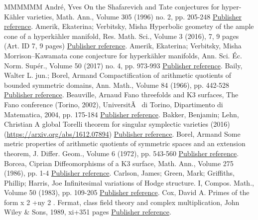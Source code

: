 \begin{thebibliography}{MMMMMM}
 André, Yves On the Shafarevich and Tate conjectures for hyper-Kähler varieties, Math. Ann., Volume 305 (1996) no. 2, pp. 205-248 \href{https://ahl.centre-mersenne.org/item/AHL_2018__1__227_0/#Andre}{Publisher reference}.
 Amerik, Ekaterina; Verbitsky, Misha Hyperbolic geometry of the ample cone of a hyperkähler manifold, Res. Math. Sci., Volume 3 (2016), 7, 9 pages (Art. ID 7, 9 pages) \href{https://ahl.centre-mersenne.org/item/AHL_2018__1__227_0/#AmVerb2}{Publisher reference}.
 Amerik, Ekaterina; Verbitsky, Misha Morrison–Kawamata cone conjecture for hyperkähler manifolds, Ann. Sci. Éc. Norm. Supér., Volume 50 (2017) no. 4, pp. 973-993 \href{https://ahl.centre-mersenne.org/item/AHL_2018__1__227_0/#AmVerb}{Publisher reference}.
 Baily, Walter L. jun.; Borel, Armand Compactification of arithmetic quotients of bounded symmetric domains, Ann. Math., Volume 84 (1966), pp. 442-528 \href{https://ahl.centre-mersenne.org/item/AHL_2018__1__227_0/#BB}{Publisher reference}.
 Beauville, Arnaud Fano threefolds and K3 surfaces, The Fano conference (Torino, 2002), UniversitÃ  di Torino, Dipartimento di Matematica, 2004, pp. 175-184 \href{https://ahl.centre-mersenne.org/item/AHL_2018__1__227_0/#Beauv}{Publisher reference}.
 Bakker, Benjamin; Lehn, Christian A global Torelli theorem for singular symplectic varieties (2016) (\url{https://arxiv.org/abs/1612.07894}) \href{https://ahl.centre-mersenne.org/item/AHL_2018__1__227_0/#BL}{Publisher reference}.
 Borel, Armand Some metric properties of arithmetic quotients of symmetric spaces and an extension theorem, J. Differ. Geom., Volume 6 (1972), pp. 543-560 \href{https://ahl.centre-mersenne.org/item/AHL_2018__1__227_0/#Bor}{Publisher reference}.
 Borcea, Ciprian Diffeomorphisms of a K3 surface, Math. Ann., Volume 275 (1986), pp. 1-4 \href{https://ahl.centre-mersenne.org/item/AHL_2018__1__227_0/#Borcea}{Publisher reference}.
 Carlson, James; Green, Mark; Griffiths, Phillip; Harris, Joe Infinitesimal variations of Hodge structure. I, Compos. Math., Volume 50 (1983), pp. 109-205 \href{https://ahl.centre-mersenne.org/item/AHL_2018__1__227_0/#CGGH}{Publisher reference}.
 Cox, David A. Primes of the form x 2 +ny 2 . Fermat, class field theory and complex multiplication, John Wiley \& Sons, 1989, xi+351 pages \href{https://ahl.centre-mersenne.org/item/AHL_2018__1__227_0/#Cox}{Publisher reference}.

\end{thebibliography}

